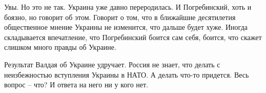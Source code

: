 Увы. Но это не так. Украина уже давно переродилась. И Погребинский, хоть и
боязно, но говорит об этом. Говорит о том, что в ближайшие десятилетия
общественное мнение Украины не изменится, что дальше будет хуже. Иногда
складывается впечатление, что Погребинский боится сам себя, боится, что скажет
слишком много правды об Украине. 

Результат Валдая об Украине удручает. Россия не знает, что делать с
неизбежностью вступления Украины в НАТО. А делать что-то придется. Весь вопрос
– что? И ответа на него ни у кого нет.

